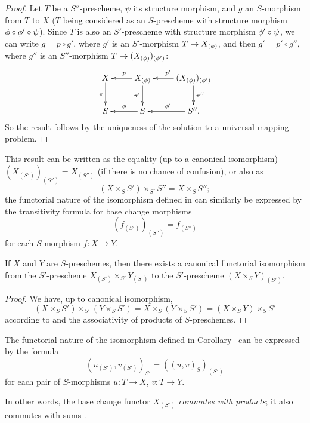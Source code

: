 \begin{proof}
Let $T$ be a $S''$-prescheme, $\psi$ its structure morphism, and $g$ an
$S$-morphism from $T$ to $X$ ($T$ being considered as an $S$-prescheme with
structure morphism $\phi\circ\phi'\circ\psi$). Since $T$ is also an $S'$-prescheme
with structure morphism $\phi'\circ\psi$, we can write $g=p\circ g'$, where
$g'$ is an $S'$-morphism $T\to X_{(\vphi)}$, and then $g'=p'\circ g''$, where
$g''$ is an $S''$-morphism $T\to(X_{(\vphi)})_{(\vphi')}$:
\[
  \xymatrix{
    X\ar[d]_\pi &
    X_{(\vphi)}\ar[l]_p\ar[d]_{\pi'} &
    (X_{(\vphi)})_{(\vphi')}\ar[l]_{p'}\ar[d]^{\pi''}\\
    S &
    S\ar[l]_\vphi &
    S''\ar[l]_{\vphi'}.
  }
\]
So the result follows by the uniqueness of the solution to a universal
mapping problem.
\end{proof}

This result can be written as the equality (up to a canonical isomorphism)
$(X_{(S')})_{(S'')}=X_{(S'')}$ (if there is no chance of confusion), or also as
\[
\label{I.3.3.9.1}
  (X\times_S S')\times_{S'}S''=X\times_S S'';
  \tag{3.3.9.1}
\]
the functorial nature of the isomorphism defined in  can
similarly be expressed by the transitivity formula for base change morphisms
\[
\label{I.3.3.9.2}
  (f_{(S')})_{(S'')}=f_{(S'')}
  \tag{3.3.9.2}
\]
for each $S$-morphism $f:X\to Y$.

\begin{corollary}[3.3.10]
\label{I.3.3.10}
If $X$ and $Y$ are $S$-preschemes, then there exists a canonical functorial
isomorphism from the $S'$-prescheme $X_{(S')}\times_{S'}Y_{(S')}$ to the
$S'$-prescheme $(X\times_S Y)_{(S')}$.
\end{corollary}

\begin{proof}
We have, up to canonical isomorphism,
\[
  (X\times_S S')\times_{S'}(Y\times_S S')
  =X\times_S(Y\times_S S')=(X\times_S Y)\times_S S'
\]
according to  and the associativity of products of $S$-preschemes.
\end{proof}

The functorial nature of the isomorphism defined in
Corollary~ can be expressed by the formula
\[
\label{I.3.3.10.1}
  (u_{(S')},v_{(S')})_{S'}=((u,v)_S)_{(S')}
  \tag{3.3.10.1}
\]
for each pair of $S$-morphisms $u:T\to X$, $v:T\to Y$.

In other words, the base change functor $X_{(S')}$ \emph{commutes with
products}; it also commutes with sums .

